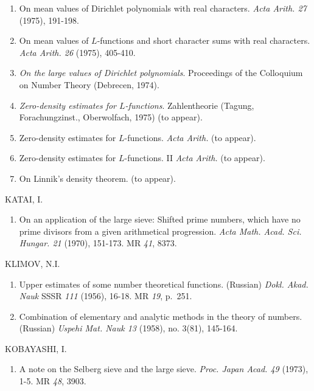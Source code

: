 \begin{thebibliography}{99}
\begin{enumerate}
\item On mean values of Dirichlet polynomials with real
  characters. \textit{Acta Arith. 27} (1975), 191-198. 

\item On mean values of $L$-functions and short character sums with
  real characters. \textit{Acta Arith. 26} (1975), 405-410. 

\item \textit{On the large values of Dirichlet
  polynomials}. Proceedings of the Colloquium on Number Theory
  (Debrecen, 1974). 

\item \textit{Zero-density estimates for $L$-functions}. Zahlentheorie
  (Tagung, Forachungzinst., Oberwolfach, 1975) (to appear). 

\item Zero-density estimates for $L$-functions. \textit{Acta
  Arith.} (to appear). 

\item Zero-density estimates for $L$-functions. II \textit{Acta
  Arith.} (to appear). 

\item On Linnik's density theorem. (to appear). 
\end{enumerate}

 KATAI, I.
\begin{enumerate}
\item On an application of the large sieve: Shifted prime
  numbers, which have no prime divisors from a given arithmetical
  progression. \textit{Acta
    Math. Acad. Sci. Hungar. 21} (1970), 151-173. MR {\em 41}, 8373. 
\end{enumerate}

 KLIMOV, N.I.\pageoriginale
\begin{enumerate}
\item Upper estimates of some number theoretical functions. (Russian)
  \textit{Dokl. Akad. Nauk} SSSR {\em 111} (1956), 16-18. MR {\em 19},
  p.~251.

\item Combination of elementary and analytic methods in the theory of
  numbers. (Russian) \textit{Uspehi Mat. Nauk 13} (1958),  no. 3(81),
  145-164. 
\end{enumerate}

 KOBAYASHI, I.
\begin{enumerate}
\item A note on the Selberg sieve and the large
  sieve. \textit{Proc. Japan Acad. 49} (1973), 1-5. MR {\em 48}, 3903.
\end{enumerate}


\end{thebibliography}
